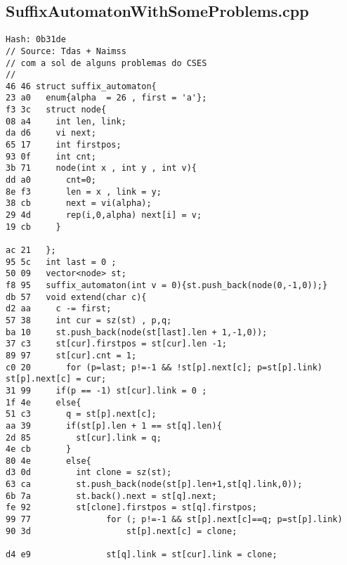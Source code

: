 \documentclass[11pt, a4paper, twoside]{article}
\begin{document}
\subsection{SuffixAutomatonWithSomeProblems.cpp}
\begin{lstlisting}
Hash: 0b31de
// Source: Tdas + Naimss
// com a sol de alguns problemas do CSES
// 
46 46 struct suffix_automaton{
23 a0   enum{alpha  = 26 , first = 'a'};
f3 3c   struct node{
08 a4     int len, link;
da d6     vi next;
65 17     int firstpos;
93 0f     int cnt;
3b 71     node(int x , int y , int v){
dd a0       cnt=0;
8e f3       len = x , link = y;
38 cb       next = vi(alpha);
29 4d       rep(i,0,alpha) next[i] = v;
19 cb     }
      
ac 21   };
95 5c   int last = 0 ;
50 09   vector<node> st; 
f8 95   suffix_automaton(int v = 0){st.push_back(node(0,-1,0));}
db 57   void extend(char c){
d2 aa     c -= first;
57 38     int cur = sz(st) , p,q;
ba 10     st.push_back(node(st[last].len + 1,-1,0));
37 c3     st[cur].firstpos = st[cur].len -1;
89 97     st[cur].cnt = 1;
c0 20       for (p=last; p!=-1 && !st[p].next[c]; p=st[p].link) st[p].next[c] = cur;        
31 99     if(p == -1) st[cur].link = 0 ;
1f 4e     else{
51 c3       q = st[p].next[c];
aa 39       if(st[p].len + 1 == st[q].len){
2d 85         st[cur].link = q;
4e cb       }
80 4e       else{
d3 0d         int clone = sz(st);
63 ca         st.push_back(node(st[p].len+1,st[q].link,0));
6b 7a         st.back().next = st[q].next;
fe 92         st[clone].firstpos = st[q].firstpos;
99 77               for (; p!=-1 && st[p].next[c]==q; p=st[p].link)
90 3d                   st[p].next[c] = clone;
                   
d4 e9               st[q].link = st[cur].link = clone;
      

\end{lstlisting}
\end{document}
